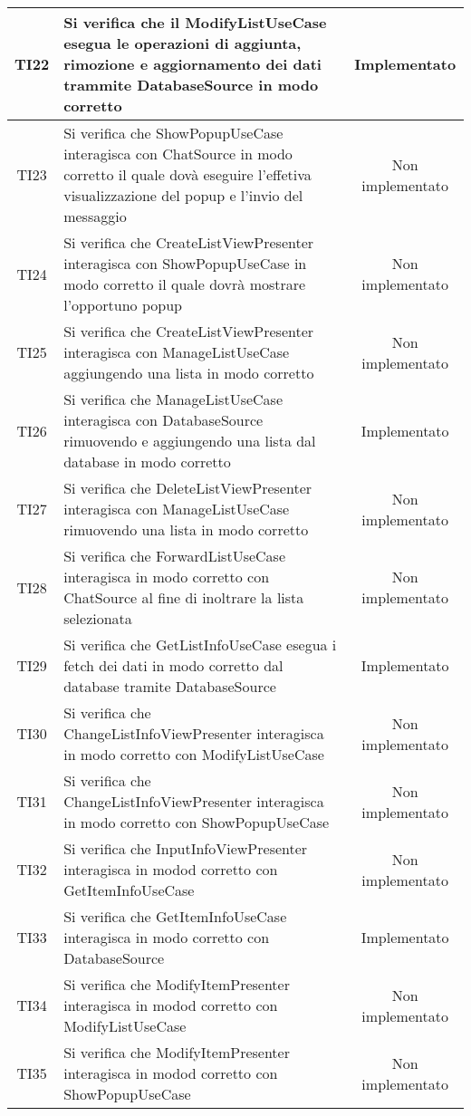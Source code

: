 \begin{center}
\begin{longtable}{|c|>{\centering}m{10cm}|c|}
		TI22 & Si verifica che il ModifyListUseCase esegua le operazioni di aggiunta, rimozione e aggiornamento dei dati trammite DatabaseSource in modo corretto & Implementato \\ \hline
		TI23 & Si verifica che ShowPopupUseCase interagisca con ChatSource in modo corretto il quale dovà eseguire l’effetiva visualizzazione del popup e l’invio del messaggio & Non implementato \\ \hline
		TI24 & Si verifica che CreateListViewPresenter interagisca con ShowPopupUseCase in modo corretto il quale dovrà mostrare l'opportuno popup & Non implementato \\ \hline
		TI25 & Si verifica che CreateListViewPresenter interagisca con ManageListUseCase aggiungendo una lista in modo corretto & Non implementato \\ \hline
		TI26 & Si verifica che ManageListUseCase interagisca con DatabaseSource rimuovendo e aggiungendo una lista dal database in modo corretto & Implementato \\ \hline
		TI27 & Si verifica che DeleteListViewPresenter interagisca con ManageListUseCase rimuovendo una lista in modo corretto & Non implementato \\ \hline
		TI28 & Si verifica che ForwardListUseCase interagisca in modo corretto con ChatSource al fine di inoltrare la lista selezionata & Non implementato \\ \hline
		TI29 & Si verifica che GetListInfoUseCase esegua i fetch dei dati in modo corretto dal database tramite DatabaseSource & Implementato \\ \hline
		TI30 & Si verifica che ChangeListInfoViewPresenter interagisca in modo corretto con ModifyListUseCase & Non implementato \\ \hline
		TI31 & Si verifica che ChangeListInfoViewPresenter interagisca in modo corretto con ShowPopupUseCase & Non implementato \\ \hline
		TI32 & Si verifica che InputInfoViewPresenter interagisca in modod corretto con GetItemInfoUseCase & Non implementato \\ \hline
		TI33 & Si verifica che GetItemInfoUseCase interagisca in modo corretto con DatabaseSource & Implementato \\ \hline
		TI34 & Si verifica che ModifyItemPresenter interagisca in modod corretto con ModifyListUseCase & Non implementato \\ \hline
		TI35 & Si verifica che ModifyItemPresenter interagisca in modod corretto con ShowPopupUseCase & Non implementato \\ \hline

\end{longtable}
\end{center}
